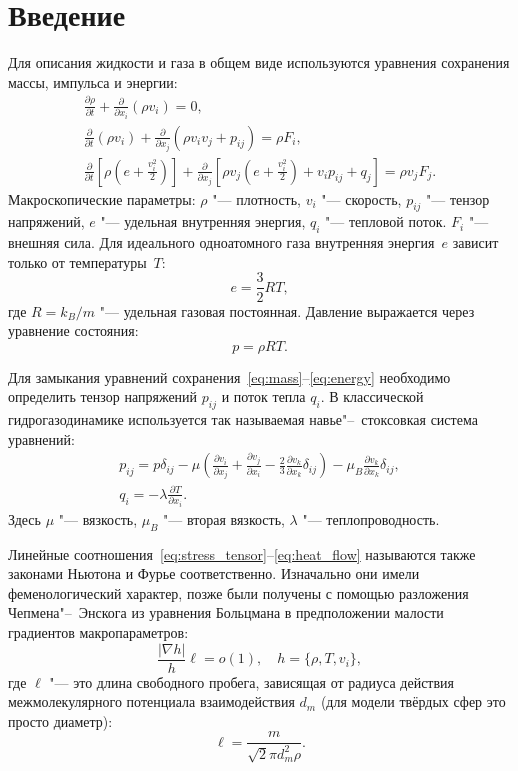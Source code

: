 \documentclass[english,russian,a4paper,12pt]{article}
\newcommand{\pder}[2][]{\frac{\partial#1}{\partial#2}}
\begin{document}
\tableofcontents

\section{Введение}

Для описания жидкости и газа в общем виде используются уравнения сохранения массы, импульса и энергии:
\begin{gather}
	\pder[\rho]{t} + \pder{x_i}(\rho v_i) = 0, \label{eq:mass}\\
	\pder{t}(\rho v_i) + \pder{x_j}(\rho v_i v_j + p_{ij}) = \rho F_i, \label{eq:momentum}\\
	\pder{t}\left[\rho\left(e+\frac{v_i^2}2\right)\right] +
		\pder{x_j}\left[\rho v_j\left(e+\frac{v_i^2}2\right)+v_i p_{ij}+q_j\right] = \rho v_j F_j. \label{eq:energy}
\end{gather}
Макроскопические параметры: \(\rho\) "--- плотность, \(v_i\) "--- скорость, \(p_{ij}\) "--- тензор напряжений,
\(e\) "--- удельная внутренняя энергия, \(q_i\) "--- тепловой поток. \(F_i\) "--- внешняя сила.
Для идеального одноатомного газа внутренняя энергия~\(e\) зависит только от температуры~\(T\):
\[ e = \frac32RT,\]
где \(R=k_B/m\) "--- удельная газовая постоянная. Давление выражается через уравнение состояния:
\[ p = \rho RT. \]

Для замыкания уравнений сохранения~\eqref{eq:mass}--\eqref{eq:energy}
необходимо определить тензор напряжений \(p_{ij}\) и поток тепла \(q_i\).
В классической гидрогазодинамике используется так называемая навье"--~стоксовкая система уравнений:
\begin{gather}
	p_{ij} = p\delta_{ij} - \mu\left(\pder[v_i]{x_j}+\pder[v_j]{x_i}-\frac23\pder[v_k]{x_k}\delta_{ij}\right) -
		\mu_B\pder[v_k]{x_k}\delta_{ij}, \label{eq:stress_tensor}\\
	q_i = -\lambda\pder[T]{x_i}. \label{eq:heat_flow}
\end{gather}
Здесь \(\mu\) "--- вязкость, \(\mu_B\) "--- вторая вязкость, \(\lambda\) "--- теплопроводность. 

Линейные соотношения~\eqref{eq:stress_tensor}--\eqref{eq:heat_flow} называются
также законами Ньютона и Фурье соответственно.
Изначально они имели феменологический характер, позже были получены с помощью разложения Чепмена"--~Энскога
из уравнения Больцмана в предположении малости градиентов макропараметров:
\[ \frac{|\nabla h|}{h}\ell = o(1), \quad h = \{\rho, T, v_i\}, \]
где \(\ell\) "--- это длина свободного пробега,
зависящая от радиуса действия межмолекулярного потенциала взаимодействия \(d_m\)
(для модели твёрдых сфер это просто диаметр):
\begin{equation}
	\ell = \frac{m}{\sqrt2\pi d_m^2 \rho}.
\end{equation}
\end{document}
